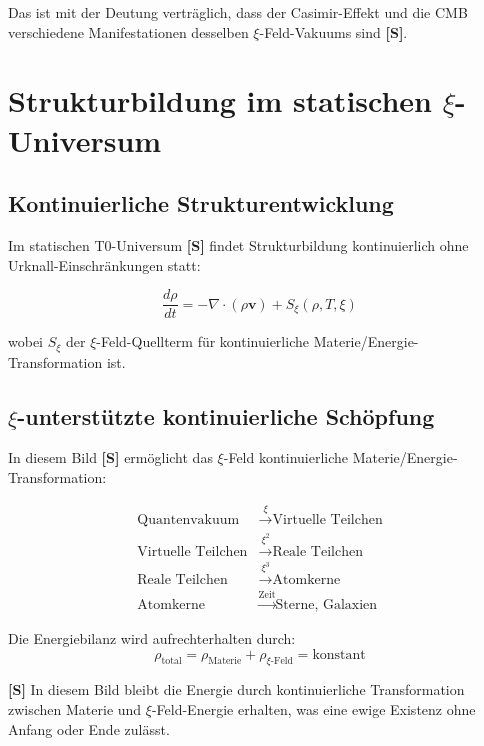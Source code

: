 	Das ist mit der Deutung verträglich, dass der Casimir-Effekt und die CMB verschiedene Manifestationen desselben $\xi$-Feld-Vakuums sind \textbf{[S]}.
	
	\section{Strukturbildung im statischen $\xi$-Universum}
	
	\subsection{Kontinuierliche Strukturentwicklung}
	
	Im statischen T0-Universum \textbf{[S]} findet Strukturbildung kontinuierlich ohne Urknall-Einschränkungen statt:
	
	\begin{equation}
		\frac{d\rho}{dt} = -\nabla \cdot (\rho \mathbf{v}) + S_\xi(\rho, T, \xi)
	\end{equation}
	
	wobei $S_\xi$ der $\xi$-Feld-Quellterm für kontinuierliche Materie/Energie-Transformation ist.
	
	\subsection{$\xi$-unterstützte kontinuierliche Schöpfung}
	
	In diesem Bild \textbf{[S]} ermöglicht das $\xi$-Feld kontinuierliche Materie/Energie-Transformation:
	
	\begin{align}
		\text{Quantenvakuum} &\xrightarrow{\xi} \text{Virtuelle Teilchen} \\
		\text{Virtuelle Teilchen} &\xrightarrow{\xi^2} \text{Reale Teilchen} \\
		\text{Reale Teilchen} &\xrightarrow{\xi^3} \text{Atomkerne} \\
		\text{Atomkerne} &\xrightarrow{\text{Zeit}} \text{Sterne, Galaxien}
	\end{align}
	
	Die Energiebilanz wird aufrechterhalten durch:
	\begin{equation}
		\rho_{\text{total}} = \rho_{\text{Materie}} + \rho_{\xi\text{-Feld}} = \text{konstant}
	\end{equation}
	
	\begin{important}
		\textbf{[S]} In diesem Bild bleibt die Energie durch kontinuierliche Transformation zwischen Materie und $\xi$-Feld-Energie erhalten, was eine ewige Existenz ohne Anfang oder Ende zulässt.
	\end{important}
	
